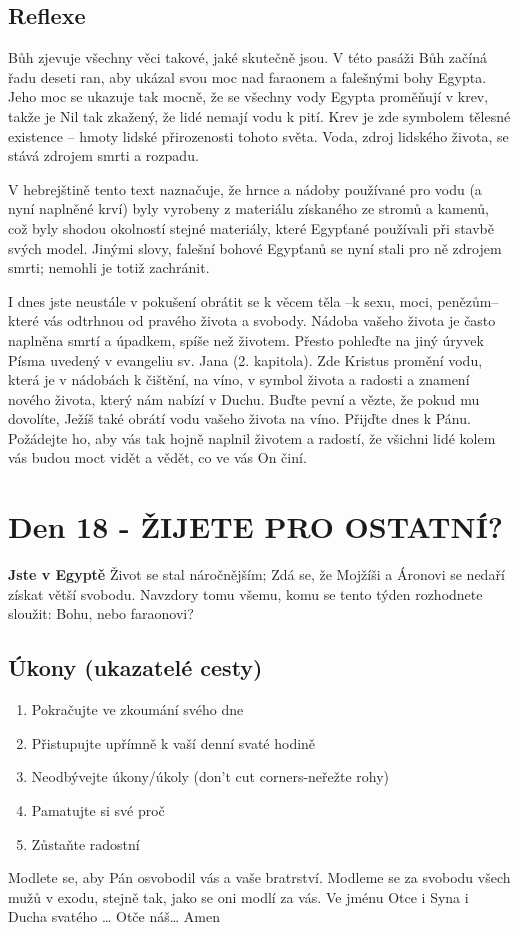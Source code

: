 \documentclass[11pt]{article}
\newcommand{\zacatekTretiTyden}{
  \textbf{Jste v Egyptě} \newline
  Život se stal náročnějším; Zdá se, že Mojžíši a Áronovi se nedaří získat větší svobodu. Navzdory tomu všemu,
komu se tento týden rozhodnete sloužit: Bohu, nebo faraonovi?

\subsection*{Úkony (ukazatelé cesty)}
\begin{enumerate}
  \item Pokračujte ve zkoumání svého dne
  \item Přistupujte upřímně k vaší denní svaté hodině
  \item Neodbývejte úkony/úkoly (don’t cut corners-neřežte rohy)
  \item Pamatujte si své proč
  \item Zůstaňte radostní
\end{enumerate}
Modlete se, aby Pán osvobodil vás a vaše bratrství. \newline
Modleme se za svobodu všech mužů v exodu, stejně tak, jako se oni modlí za vás.\newline
Ve jménu Otce i Syna i Ducha svatého …  Otče náš… Amen
}
\begin{document}
\subsection*{Reflexe}

Bůh zjevuje všechny věci takové, jaké skutečně jsou. V této pasáži Bůh začíná řadu deseti ran, aby ukázal svou
moc nad faraonem a falešnými bohy Egypta. Jeho moc se ukazuje tak mocně, že se všechny vody Egypta
proměňují v krev, takže je Nil tak zkažený, že lidé nemají vodu k pití. Krev je zde symbolem tělesné existence –
hmoty lidské přirozenosti tohoto světa. Voda, zdroj lidského života, se stává zdrojem smrti a rozpadu.

V hebrejštině tento text naznačuje, že hrnce a nádoby používané pro vodu (a nyní naplněné krví) byly vyrobeny z
materiálu získaného ze stromů a kamenů, což byly shodou okolností stejné materiály, které Egypťané používali při
stavbě svých model. Jinými slovy, falešní bohové Egypťanů se nyní stali pro ně zdrojem smrti; nemohli je totiž
zachránit.

I dnes jste neustále v pokušení obrátit se k věcem těla –k sexu, moci, penězům– které vás odtrhnou od pravého
života a svobody. Nádoba vašeho života je často naplněna smrtí a úpadkem, spíše než životem. Přesto pohleďte na
jiný úryvek Písma uvedený v evangeliu sv. Jana (2. kapitola). Zde Kristus promění vodu, která je v nádobách k
čištění, na víno, v symbol života a radosti a znamení nového života, který nám nabízí v Duchu. Buďte pevní a
vězte, že pokud mu dovolíte, Ježíš také obrátí vodu vašeho života na víno. Přijďte dnes k Pánu. Požádejte ho, aby
vás tak hojně naplnil životem a radostí, že všichni lidé kolem vás budou moct vidět a vědět, co ve vás On činí.

\newpage
\section{Den 18 - ŽIJETE PRO OSTATNÍ?}
\zacatekTretiTyden
\end{document}
